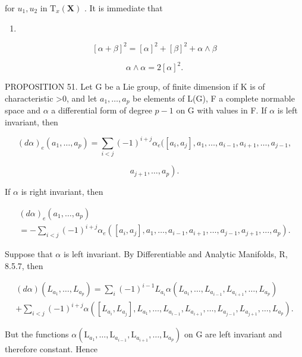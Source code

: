 for \(u_{1}, u_{2}\) in \(\mathrm{T}_x(\mathbf{X})\) . It is immediate that

\begin{enumerate}
\def\labelenumi{(\arabic{enumi})}
\setcounter{enumi}{29}
\tightlist
\item
\end{enumerate}

\[
[ \alpha + \beta ] ^ {2} = [ \alpha ] ^ {2} + [ \beta ] ^ {2} + \alpha \wedge \beta\tag{31}
\]

\[
\alpha \wedge \alpha = 2 [ \alpha ] ^ {2}.
\]

PROPOSITION 51. Let G be a Lie group, of finite dimension if K is of characteristic \textgreater0, and let \(a_{1},\ldots,a_{p}\) be elements of L(G), F a complete normable space and \(\alpha\) a differential form of degree \(p-1\) on G with values in F. If \(\alpha\) is left invariant, then

\[
(d \alpha) _ {e} (a _ {1}, \dots , a _ {p}) = \sum_ {i <   j} (- 1) ^ {i + j} \alpha_ {e} ([ a _ {i}, a _ {j} ], a _ {1}, \dots , a _ {i - 1}, a _ {i + 1}, \dots , a _ {j - 1},
\]

\[
\left. a _ {j + 1}, \dots , a _ {p}\right).
\]

If \(\alpha\) is right invariant, then

\[
\begin{array}{l} (d \alpha) _ {e} (a _ {1}, \dots , a _ {p}) \\ = - \sum_ {i <   j} (- 1) ^ {i + j} \alpha_ {e} ([ a _ {i}, a _ {j} ], a _ {1}, \dots , a _ {i - 1}, a _ {i + 1}, \dots , a _ {j - 1}, a _ {j + 1}, \dots , a _ {p}). \end{array}
\]

Suppose that \(\alpha\) is left invariant. By Differentiable and Analytic Manifolds, R, 8.5.7, then

\[
\begin{array}{l} (d \alpha) (L _ {a _ {1}}, \ldots , L _ {a _ {p}}) = \sum_ {i} (- 1) ^ {i - 1} L _ {a _ {i}} \alpha (L _ {a _ {1}}, \ldots , L _ {a _ {i - 1}}, L _ {a _ {i + 1}}, \ldots , L _ {a _ {p}}) \\ + \sum_ {i <   j} (- 1) ^ {i + j} \alpha ([ L _ {a _ {i}}, L _ {a _ {j}} ], L _ {a _ {1}}, \ldots , L _ {a _ {i - 1}}, L _ {a _ {i + 1}}, \ldots , L _ {a _ {j - 1}}, L _ {a _ {j + 1}}, \ldots , L _ {a _ {p}}). \end{array}
\]

But the functions \(\alpha (\mathrm{L}_{a_1},\dots ,\mathrm{L}_{a_{i - 1}},\mathrm{L}_{a_{i + 1}},\dots ,\mathrm{L}_{a_p})\) on G are left invariant and therefore constant. Hence

